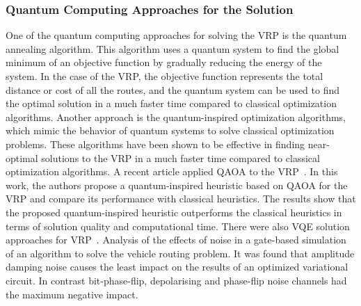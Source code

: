 \subsubsection{Quantum Computing Approaches for the Solution}
One of the quantum computing approaches for solving the VRP is the quantum annealing algorithm.
This algorithm uses a quantum system to find the global minimum of an objective function by gradually reducing the
energy of the system. In the case of the VRP, the objective function represents the total distance or cost of all
the routes, and the quantum system can be used to find the optimal solution in a much faster time compared to classical
optimization algorithms.
Another approach is the quantum-inspired optimization algorithms, which mimic the behavior of quantum systems to solve
classical optimization problems. These algorithms have been shown to be effective in finding near-optimal solutions to
the VRP in a much faster time compared to classical optimization algorithms.
A recent article applied QAOA to the VRP~\cite{9605345}. In this work, the authors propose a quantum-inspired heuristic
based on QAOA for the VRP and
compare its performance with classical heuristics. The results show that the proposed quantum-inspired heuristic
outperforms the classical heuristics in terms of solution quality and computational time.
There were also VQE solution approaches for VRP~\cite{mohanty2022analysis}.
Analysis of the effects of noise in a gate-based
simulation of an algorithm to solve the vehicle routing problem.
It was found that amplitude damping
noise causes the least impact on the results of an optimized
variational circuit. In contrast bit-phase-flip, depolarising and
phase-flip noise channels had the maximum negative impact.




